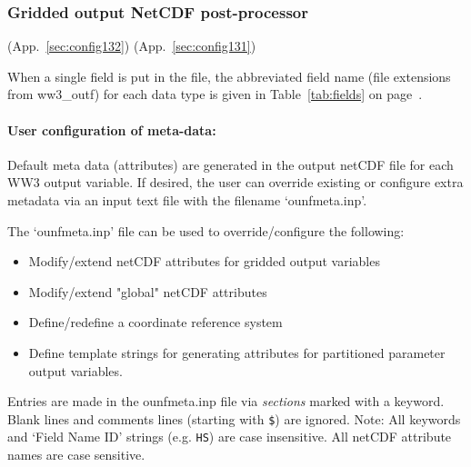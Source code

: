 \vsssub
\subsubsection{Gridded output NetCDF post-processor} \label{sec:ww3ounf}
\vsssub

 (App.~\ref{sec:config132})
 (App.~\ref{sec:config131})


\vspace{\baselineskip}

\noindent
When a single field is put in the file, the abbreviated field name (file
extensions from ww3\_outf) for each data type is given in
Table~\ref{tab:fields} on page~\pageref{tab:fields}.

\noindent
\paragraph{User configuration of meta-data:}

\noindent
Default meta data (attributes) are generated in the output netCDF file
for each WW3 output variable. If desired, the user can override existing or
configure extra metadata via an input text file with the filename `ounfmeta.inp'.


\noindent
The `ounfmeta.inp' file can be used to override/configure the following:
\begin{itemize}
  \item Modify/extend netCDF attributes for gridded output variables
  \item Modify/extend "global" netCDF attributes
  \item Define/redefine a coordinate reference system
  \item Define template strings for generating attributes for
        partitioned parameter output variables.
\end{itemize}

\noindent
Entries are made in the ounfmeta.inp file via \emph{sections} marked with a keyword.
Blank lines and comments lines (starting with \texttt{\$}) are ignored.
Note: All keywords and `Field Name ID' strings (e.g. \texttt{HS}) are
case insensitive. All netCDF attribute names are case sensitive.

